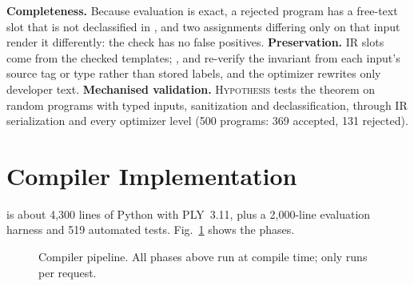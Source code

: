 \documentclass[conference]{IEEEtran}
\begin{document}
\textbf{Completeness.} Because evaluation is exact, a rejected program has a free-text slot that is not declassified in , and two assignments differing only on that input render it differently: the check has no false positives. \textbf{Preservation.} IR slots come from the checked templates; ,  and  re-verify the invariant from each input's source tag or type rather than stored labels, and the optimizer rewrites only developer text. \textbf{Mechanised validation.} \textsc{Hypothesis} tests the theorem on random programs with typed inputs, sanitization and declassification, through IR serialization and every optimizer level (500 programs: 369 accepted, 131 rejected).

\section{Compiler Implementation}

\TL{} is about 4{,}300 lines of Python with PLY~3.11, plus a 2{,}000-line evaluation harness and 519 automated tests. Fig.~\ref{fig:pipeline} shows the phases.

\begin{figure}[t]
\centering
{}
\caption{Compiler pipeline. All phases above run at compile time; only  runs per request.}
\label{fig:pipeline}
\end{figure}
\end{document}
